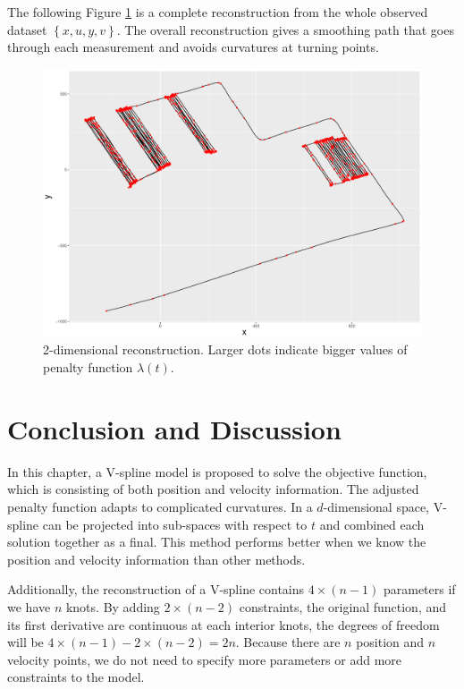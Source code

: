 The following Figure \ref{complete2DXY} is a complete reconstruction from the whole observed dataset $\left\lbrace x,u,y,v\right\rbrace$. The overall reconstruction gives a smoothing path that goes through each measurement and avoids curvatures at turning points. 
\begin{figure}
\centering
\includegraphics[width=0.9\linewidth]{Chapters/02TractorSplineTheory/plot/ggplot/ggRealdataCompleteXY.pdf}
\caption{2-dimensional reconstruction. Larger dots indicate bigger values of penalty function $\lambda(t)$.}\label{complete2DXY}
\end{figure}



\section{Conclusion and Discussion}

In this chapter, a V-spline model is proposed to solve the objective function, which is consisting of both position and velocity information. The adjusted penalty function adapts to complicated curvatures. In a $d$-dimensional space, V-spline can be projected into sub-spaces with respect to $t$ and combined each solution together as a final. This method performs better when we know the position and velocity information than other methods. 

Additionally, the reconstruction of a V-spline contains $4\times (n-1)$ parameters if we have $n$ knots. By adding $2\times (n-2)$ constraints, the original function, and its first derivative are continuous at each interior knots, the degrees of freedom will be $4\times (n-1)-2\times (n-2)=2n$. Because there are $n$ position and $n$ velocity points, we do not need to specify more parameters or add more constraints to the model. 

